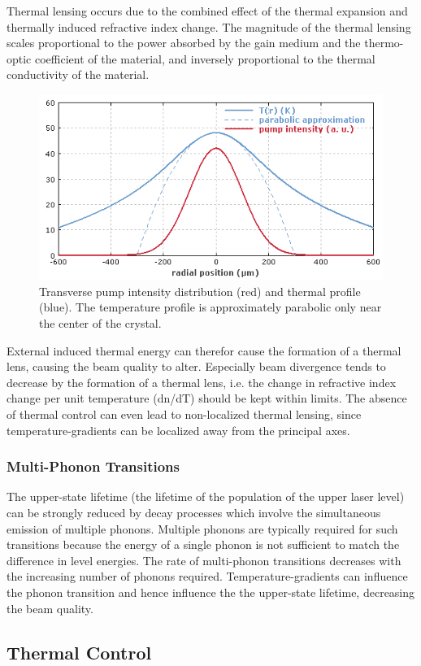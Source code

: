 Thermal lensing occurs due to the combined effect of the thermal expansion and thermally induced refractive index change. The magnitude of the thermal lensing scales proportional to the power absorbed by the gain medium and the thermo-optic coefficient of the material, and inversely proportional to the thermal conductivity of the material.   

\begin{figure} [ht]
	\begin{center}
\includegraphics[scale=1]{chapters/img/thermal_lensing.png}	
\caption{Transverse pump intensity distribution (red) and thermal profile (blue). The temperature profile is approximately parabolic only near the center of the crystal.}
\label{thermal_lensing}
\end{center}
\end{figure}

External induced thermal energy can therefor cause the formation of a thermal lens, causing the beam quality to alter. Especially beam divergence tends to decrease by the formation of a thermal lens, i.e. the change in refractive index change per unit temperature (dn/dT) should be kept within limits. The absence of thermal control can even lead to non-localized thermal lensing, since temperature-gradients can be localized away from the principal axes. 
			
	\subsubsection{Multi-Phonon Transitions}
		\label{mtLSRphonon}
The upper-state lifetime (the lifetime of the population of the upper laser level) can be strongly reduced by decay processes which involve the simultaneous emission of multiple phonons. Multiple phonons are typically required for such transitions because the energy of a single phonon is not sufficient to match the difference in level energies. The rate of multi-phonon transitions decreases with the increasing number of phonons required. Temperature-gradients can influence the phonon transition and hence influence the the upper-state lifetime, decreasing the beam quality. 


\subsection{Thermal Control}
	\label{mtLSRthermalcontrol}


